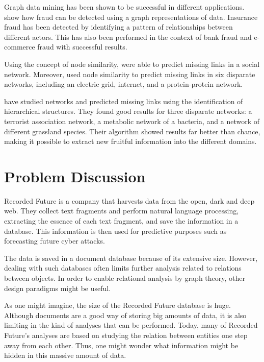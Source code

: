 Graph data mining has been shown to be successful in different applications. \citet{bankFraud} show how fraud can be detected using a graph representations of data. Insurance fraud has been detected by identifying a pattern of relationships between different actors. This has also been performed in the context of bank fraud and e-commerce fraud with successful results. 

Using the concept of node similarity, \citet{Liben-Nowell2003} were able to predict missing links in a social network. Moreover, \citet{Zhou2009} used node similarity to predict missing links in six disparate networks, including an electric grid, internet, and a protein-protein network.

\citet{clauset2008Hierarchicalstructure} have studied networks and predicted missing links using the identification of hierarchical structures. They found good results for three disparate networks: a terrorist association network, a metabolic network of a bacteria, and a network of different grassland species. Their algorithm showed results far better than chance, making it possible to extract new fruitful information into the different domains. 

\section{Problem Discussion}
Recorded Future is a company that harvests data from the open, dark and deep web. They collect text fragments and perform natural language processing, extracting the essence of each text fragment, and save the information in a database. This information is then used for predictive purposes such as forecasting future cyber attacks.

The data is saved in a document database because of its extensive size. However, dealing with such databases often limits further analysis related to relations between objects. In order to enable relational analysis by graph theory, other design paradigms might be useful.

As one might imagine, the size of the Recorded Future database is huge. Although documents are a good way of storing big amounts of data, it is also limiting in the kind of analyses that can be performed. Today, many of Recorded Future's analyses are based on studying the relation between entities one step away from each other. Thus, one might wonder what information might be hidden in this massive amount of data.

